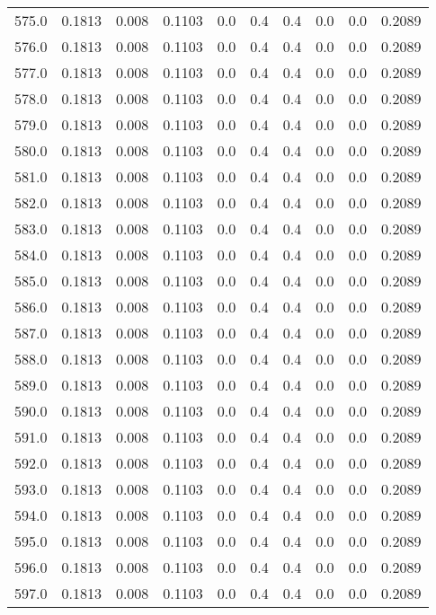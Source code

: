 \begin{longtable}{lrrrrrrrrr}
575.0 & 0.1813 & 0.008 & 0.1103 & 0.0 & 0.4 & 0.4 & 0.0 & 0.0 & 0.2089 \\
576.0 & 0.1813 & 0.008 & 0.1103 & 0.0 & 0.4 & 0.4 & 0.0 & 0.0 & 0.2089 \\
577.0 & 0.1813 & 0.008 & 0.1103 & 0.0 & 0.4 & 0.4 & 0.0 & 0.0 & 0.2089 \\
578.0 & 0.1813 & 0.008 & 0.1103 & 0.0 & 0.4 & 0.4 & 0.0 & 0.0 & 0.2089 \\
579.0 & 0.1813 & 0.008 & 0.1103 & 0.0 & 0.4 & 0.4 & 0.0 & 0.0 & 0.2089 \\
580.0 & 0.1813 & 0.008 & 0.1103 & 0.0 & 0.4 & 0.4 & 0.0 & 0.0 & 0.2089 \\
581.0 & 0.1813 & 0.008 & 0.1103 & 0.0 & 0.4 & 0.4 & 0.0 & 0.0 & 0.2089 \\
582.0 & 0.1813 & 0.008 & 0.1103 & 0.0 & 0.4 & 0.4 & 0.0 & 0.0 & 0.2089 \\
583.0 & 0.1813 & 0.008 & 0.1103 & 0.0 & 0.4 & 0.4 & 0.0 & 0.0 & 0.2089 \\
584.0 & 0.1813 & 0.008 & 0.1103 & 0.0 & 0.4 & 0.4 & 0.0 & 0.0 & 0.2089 \\
585.0 & 0.1813 & 0.008 & 0.1103 & 0.0 & 0.4 & 0.4 & 0.0 & 0.0 & 0.2089 \\
586.0 & 0.1813 & 0.008 & 0.1103 & 0.0 & 0.4 & 0.4 & 0.0 & 0.0 & 0.2089 \\
587.0 & 0.1813 & 0.008 & 0.1103 & 0.0 & 0.4 & 0.4 & 0.0 & 0.0 & 0.2089 \\
588.0 & 0.1813 & 0.008 & 0.1103 & 0.0 & 0.4 & 0.4 & 0.0 & 0.0 & 0.2089 \\
589.0 & 0.1813 & 0.008 & 0.1103 & 0.0 & 0.4 & 0.4 & 0.0 & 0.0 & 0.2089 \\
590.0 & 0.1813 & 0.008 & 0.1103 & 0.0 & 0.4 & 0.4 & 0.0 & 0.0 & 0.2089 \\
591.0 & 0.1813 & 0.008 & 0.1103 & 0.0 & 0.4 & 0.4 & 0.0 & 0.0 & 0.2089 \\
592.0 & 0.1813 & 0.008 & 0.1103 & 0.0 & 0.4 & 0.4 & 0.0 & 0.0 & 0.2089 \\
593.0 & 0.1813 & 0.008 & 0.1103 & 0.0 & 0.4 & 0.4 & 0.0 & 0.0 & 0.2089 \\
594.0 & 0.1813 & 0.008 & 0.1103 & 0.0 & 0.4 & 0.4 & 0.0 & 0.0 & 0.2089 \\
595.0 & 0.1813 & 0.008 & 0.1103 & 0.0 & 0.4 & 0.4 & 0.0 & 0.0 & 0.2089 \\
596.0 & 0.1813 & 0.008 & 0.1103 & 0.0 & 0.4 & 0.4 & 0.0 & 0.0 & 0.2089 \\
597.0 & 0.1813 & 0.008 & 0.1103 & 0.0 & 0.4 & 0.4 & 0.0 & 0.0 & 0.2089 \\

\end{longtable}
